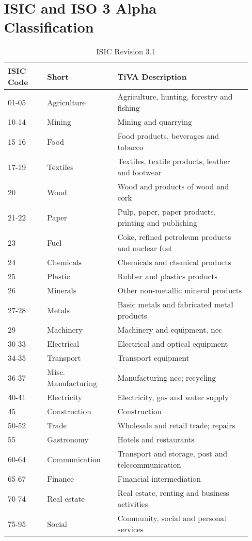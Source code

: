\section{ISIC and ISO 3 Alpha Classification}
\begin{table}[H]
\centering \caption{ISIC Revision 3.1}
\begin{tabular}{lll}
\toprule
ISIC Code&Short & TiVA Description \\ 
\midrule
  01-05  &Agriculture & Agriculture, hunting, forestry and fishing \\ 
10-14& Mining& Mining and quarrying \\ 
15-16& Food & Food products, beverages and tobacco \\ 
17-19&  Textiles& Textiles, textile products, leather and footwear \\ 
20& Wood & Wood and products of wood and cork \\ 
  21-22& Paper & Pulp, paper, paper products, printing and publishing \\ 
  23 &Fuel& Coke, refined petroleum products and nuclear fuel \\ 
  24 &Chemicals& Chemicals and chemical products \\ 
  25 &Plastic& Rubber and plastics products \\ 
  26&Minerals & Other non-metallic mineral products \\ 
  27-28&Metals & Basic metals and fabricated metal products \\ 
  29 &Machinery & Machinery and equipment, nec  \\ 
  30-33&Electrical & Electrical and optical equipment \\ 
  34-35 &Transport& Transport equipment \\ 
  36-37 &Misc. Manufacturing& Manufacturing nec; recycling  \\ 
  40-41 &Electricity & Electricity, gas and water supply \\ 
  45  & Construction& Construction \\ 
  50-52&Trade & Wholesale and retail trade; repairs \\ 
 55 &Gastronomy & Hotels and restaurants \\ 
  60-64&Communication & Transport and storage, post and telecommunication \\ 
  65-67 &Finance& Financial intermediation \\ 
  70-74 &Real estate& Real estate, renting and business activities \\ 
  75-95& Social & Community, social and personal services  \\ 
   \bottomrule
\end{tabular}
\end{table}

